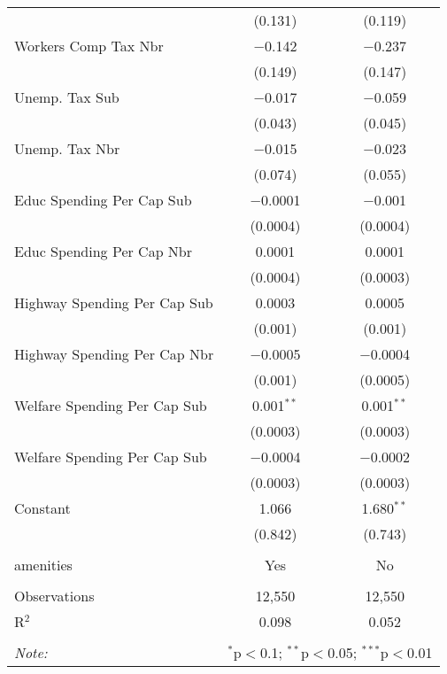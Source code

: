 \begin{table}[!htbp]
\begin{tabular}{@{\extracolsep{5pt}}lcc}
  & (0.131) & (0.119) \\ 
  Workers Comp Tax Nbr & $-$0.142 & $-$0.237 \\ 
  & (0.149) & (0.147) \\ 
  Unemp. Tax Sub & $-$0.017 & $-$0.059 \\ 
  & (0.043) & (0.045) \\ 
  Unemp. Tax Nbr & $-$0.015 & $-$0.023 \\ 
  & (0.074) & (0.055) \\ 
  Educ Spending Per Cap Sub & $-$0.0001 & $-$0.001 \\ 
  & (0.0004) & (0.0004) \\ 
  Educ Spending Per Cap Nbr & 0.0001 & 0.0001 \\ 
  & (0.0004) & (0.0003) \\ 
  Highway Spending Per Cap Sub & 0.0003 & 0.0005 \\ 
  & (0.001) & (0.001) \\ 
  Highway Spending Per Cap Nbr & $-$0.0005 & $-$0.0004 \\ 
  & (0.001) & (0.0005) \\ 
  Welfare Spending Per Cap Sub & 0.001$^{**}$ & 0.001$^{**}$ \\ 
  & (0.0003) & (0.0003) \\ 
  Welfare Spending Per Cap Sub & $-$0.0004 & $-$0.0002 \\ 
  & (0.0003) & (0.0003) \\ 
  Constant & 1.066 & 1.680$^{**}$ \\ 
  & (0.842) & (0.743) \\ 
 \hline \\[-1.8ex] 
amenities & Yes & No \\ 
\hline \\[-1.8ex] 
Observations & 12,550 & 12,550 \\ 
R$^{2}$ & 0.098 & 0.052 \\ 
\hline 
\hline \\[-1.8ex] 
\textit{Note:}  & \multicolumn{2}{r}{$^{*}$p$<$0.1; $^{**}$p$<$0.05; $^{***}$p$<$0.01} \\ 
\end{tabular} 
\end{table} 

